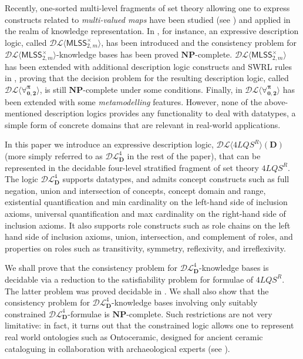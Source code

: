 \documentclass[a4paper]{llncs}
\newcommand{\dlss}{\mathcal{DL}\langle 4LQS^R\rangle(\D)}
\newcommand{\shdlss}{\mathcal{DL}_{\D}^{4}}
\newcommand{\flqsr}{\ensuremath{4LQS^R}}
\newcommand{\D}{\mathbf{D}}
\begin{document}
\newcommand{\mlsscart}{\ensuremath{\mathsf{MLSS}_{2,m}^{\times}}}
\newcommand{\dlmlsscart}{\ensuremath{\mathcal{DL\langle}\mathsf{MLSS}_{2,m}^{\times}\mathcal{\rangle}}}
\newcommand{\dlForallpizerotwo}{\ensuremath{\mathcal{DL\langle}\Forallpizerotwo\mathcal{\rangle}}}
\newcommand{\Forallpizerotwo}{\ensuremath{\mathbf{\forall_{0,2}^{\pi}}}}


Recently, one-sorted multi-level fragments of set theory allowing one to express constructs related to \emph{multi-valued maps} have been studied (see \cite{CanLonNic2010, CanLonNic11, CanLon2014}) and applied in the realm of knowledge representation. In \cite{CanLonPis2010}, for instance, an expressive description logic, called $\dlmlsscart$, has been introduced and the consistency problem for $\dlmlsscart$-knowledge bases has been proved $\mathbf{NP}$-complete. $\dlmlsscart$ has been extended with additional description logic constructs and SWRL rules in \cite{CanLonNic11}, proving that the decision problem for the resulting description logic, called $\dlForallpizerotwo$, is still $\mathbf{NP}$-complete under some conditions. Finally, in \cite{CanLon2014} $\dlForallpizerotwo$ has been extended with some \emph{metamodelling} features.
However, none of the above-mentioned description logics provides any functionality to deal with
datatypes, a simple form of concrete domains that are relevant in real-world applications.





In this paper we introduce an expressive description logic, $\dlss$ (more simply referred to as $\shdlss$ in the rest of the paper), that can be represented in the decidable four-level stratified fragment of set theory \flqsr. The logic $\shdlss$ supports da\-ta\-ty\-pes, and admits concept constructs such as full negation, union and intersection of concepts, concept domain and range, existential quantification and min cardinality on the left-hand side of inclusion axioms, universal quantification and max cardinality on the right-hand side of inclusion axioms. It also supports role constructs such as role chains on the left hand side of inclusion axioms, union, intersection, and complement of roles, and properties on roles such as transitivity, symmetry, reflexivity, and irreflexivity.

We shall prove that the consistency problem for $\shdlss$-knowledge bases is decidable via a reduction to the satisfiability problem for formulae of \flqsr. The latter problem was proved decidable in \cite{CanNic2013}.  We shall also show that the consistency problem for $\shdlss$-knowledge bases involving only suitably constrained $\shdlss$-formulae is $\mathbf{NP}$-complete. Such restrictions are not very limitative: in fact, it turns out that the constrained logic allows one to represent real world ontologies such as \textsf{Ontoceramic}, designed for ancient ceramic cataloguing in collaboration with archaeological experts (see \cite{caa2015:ontoceramic,santaLAP}).
\end{document}
